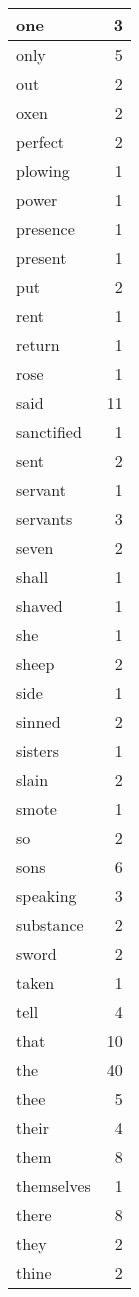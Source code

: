 \begin{center}
\begin{longtable}{l|r}
one & 3\\ \hline 
only & 5\\ \hline 
out & 2\\ \hline 
oxen & 2\\ \hline 
perfect & 2\\ \hline 
plowing & 1\\ \hline 
power & 1\\ \hline 
presence & 1\\ \hline 
present & 1\\ \hline 
put & 2\\ \hline 
rent & 1\\ \hline 
return & 1\\ \hline 
rose & 1\\ \hline 
said & 11\\ \hline 
sanctified & 1\\ \hline 
sent & 2\\ \hline 
servant & 1\\ \hline 
servants & 3\\ \hline 
seven & 2\\ \hline 
shall & 1\\ \hline 
shaved & 1\\ \hline 
she & 1\\ \hline 
sheep & 2\\ \hline 
side & 1\\ \hline 
sinned & 2\\ \hline 
sisters & 1\\ \hline 
slain & 2\\ \hline 
smote & 1\\ \hline 
so & 2\\ \hline 
sons & 6\\ \hline 
speaking & 3\\ \hline 
substance & 2\\ \hline 
sword & 2\\ \hline 
taken & 1\\ \hline 
tell & 4\\ \hline 
that & 10\\ \hline 
the & 40\\ \hline 
thee & 5\\ \hline 
their & 4\\ \hline 
them & 8\\ \hline 
themselves & 1\\ \hline 
there & 8\\ \hline 
they & 2\\ \hline 
thine & 2\\ \hline 

\end{longtable}
\end{center}
